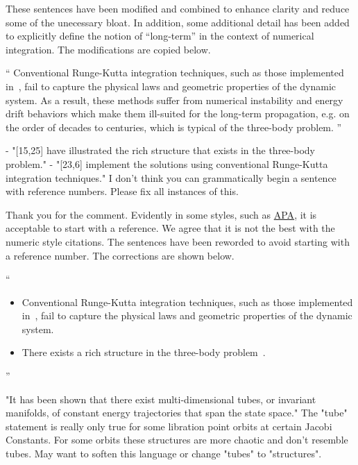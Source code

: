 \documentclass[11pt]{article}
\newenvironment{correction}{\begin{list}{}{\setlength{\leftmargin}{1cm}\setlength{\rightmargin}{1cm}}\vspace{\parsep}\item[]``}{''\end{list}}
\begin{document}
\begin{enumerate}
These sentences have been modified and combined to enhance clarity and reduce some of the unecessary bloat. 
In addition, some additional detail has been added to explicitly define the notion of ``long-term'' in the context of numerical integration.
The modifications are copied below.
\begin{correction}
    Conventional Runge-Kutta integration techniques, such as those implemented in~\cite{mingotti2011,grebow2011}, fail to capture the physical laws and geometric properties of the dynamic system.
    As a result, these methods suffer from numerical instability and energy drift behaviors which make them ill-suited for the long-term propagation, e.g. on the order of decades to centuries, which is typical of the three-body problem. 
\end{correction}

\item 
\begin{itshape}
- "[15,25] have illustrated the rich structure that exists in the three-body problem." 
- "[23,6] implement the solutions using conventional Runge-Kutta integration techniques."
I don't think you can grammatically begin a sentence with reference numbers.  Please fix all instances of this.
\end{itshape}

Thank you for the comment.
Evidently in some styles, such as \href{https://www.dlsweb.rmit.edu.au/lsu/content/1_studyskills/study_tuts/apa_ll/position.html}{APA}, it is acceptable to start with a reference.
We agree that it is not the best with the numeric style citations.
The sentences have been reworded to avoid starting with a reference number. 
The corrections are shown below.

\begin{correction}
    \begin{itemize}
        \item Conventional Runge-Kutta integration techniques, such as those implemented in~\cite{mingotti2011,grebow2011}, fail to capture the physical laws and geometric properties of the dynamic system.
        \item There exists a rich structure in the three-body problem~\cite{koon2011,ross2006}.
    \end{itemize}
\end{correction}

\item 
    \begin{itshape}
"It has been shown that there exist multi-dimensional tubes, or invariant manifolds, of constant energy trajectories that span the state space."  The "tube" statement is really only true for some libration point orbits at certain Jacobi Constants.  For some orbits these structures are more chaotic and don't resemble tubes.  May want to soften this language or change "tubes" to "structures".
\end{itshape}


\end{enumerate}
\end{document}
